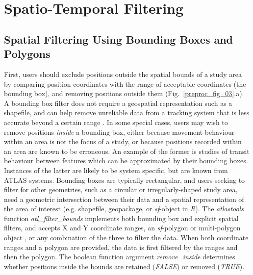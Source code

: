     \section*{Spatio-Temporal Filtering}

    \subsection*{Spatial Filtering Using Bounding Boxes and Polygons}

    First, users should exclude positions outside the spatial bounds of a study area by comparing position coordinates with the range of acceptable coordinates (the bounding box), and removing positions outside them (Fig.~\ref{preproc_fig_03}.a). 
    A bounding box filter does not require a geospatial representation such as a shapefile, and can help remove unreliable data from a tracking system that is less accurate beyond a certain range \citep[][]{beardsworth2022mee}.
    In some special cases, users may wish to remove positions \textit{inside} a bounding box, either because movement behaviour within an area is not the focus of a study, or because positions recorded within an area are known to be erroneous.
    An example of the former is studies of transit behaviour between features which can be approximated by their bounding boxes. 
    Instances of the latter are likely to be system specific, but are known from ATLAS systems. 
    Bounding boxes are typically rectangular, and users seeking to filter for other geometries, such as a circular or irregularly-shaped study area, need a geometric intersection between their data and a spatial representation of the area of interest (e.g. shapefile, geopackage, or \textit{sf}-object in \textit{R}).
    The \textit{atlastools} function \textit{atl\_filter\_bounds} implements both bounding box and explicit spatial filters, and accepts X and Y coordinate ranges, an \textit{sf}-polygon or multi-polygon object \citep{pebesma2018}, or any combination of the three to filter the data.
    When both coordinate ranges and a polygon are provided, the data is first filtered by the ranges and then the polygon.
    The boolean function argument \textit{remove\_inside} determines whether positions inside the bounds are retained (\textit{FALSE}) or removed (\textit{TRUE}).

